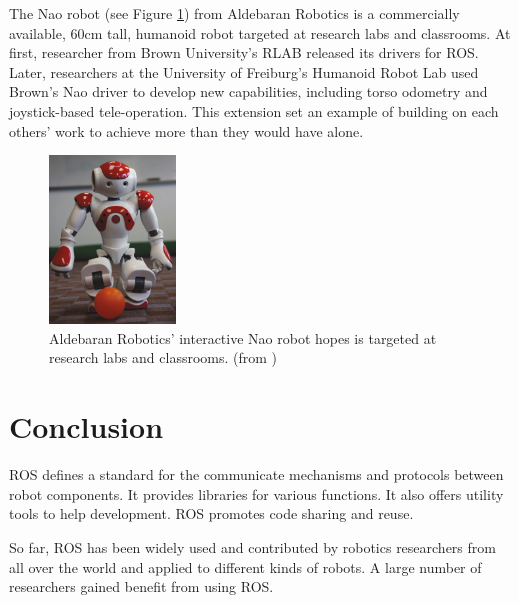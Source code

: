 \documentclass[a4paper, 10pt, conference]{ieeeconf}       %
\begin{document}
The Nao robot (see Figure \ref{fig:nao}) from Aldebaran Robotics is a commercially available, 60cm tall, humanoid robot targeted at research labs and classrooms. At first, researcher from Brown University's RLAB released its drivers for ROS. Later, researchers at the University of Freiburg's Humanoid Robot Lab used Brown's Nao driver to develop new capabilities, including torso odometry and joystick-based tele-operation. This extension set an example of building on each others' work to achieve more than they would have alone.

\begin{figure}[htpb]
  \centering
  \includegraphics[width=0.30\textwidth]{share-002}
  \caption{Aldebaran Robotics’ interactive Nao robot hopes is targeted at research labs and classrooms. (from \cite{cousins_sharing_2010})}
  \label{fig:nao}
\end{figure}

\section{Conclusion}

ROS defines a standard for the communicate mechanisms and protocols between robot components. It provides libraries for various functions. It also offers utility tools to help development. ROS promotes code sharing and reuse.

So far, ROS has been widely used and contributed by robotics researchers from all over the world and applied to different kinds of robots. A large number of researchers gained benefit from using ROS.


  
\end{document}
